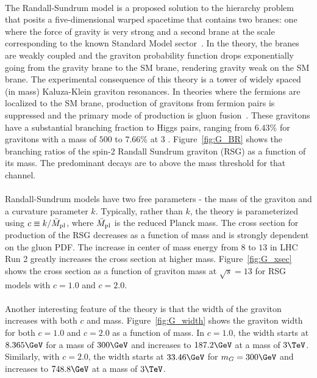 \paragraph{}
The Randall-Sundrum model is a proposed solution to the hierarchy problem that posits a five-dimensional warped spacetime that contains two branes: one where the force of gravity is very strong and a second brane at the \TeV scale corresponding to the known Standard Model sector~\cite{RSG1}. In the theory, the branes are weakly coupled and the graviton probability function drops exponentially going from the gravity brane to the SM brane, rendering gravity weak on the SM brane. The experimental consequence of this theory is a tower of widely spaced (in mass) Kaluza-Klein graviton resonances. In theories where the fermions are localized to the SM brane, production of gravitons from fermion pairs is suppressed and the primary mode of production is gluon fusion~\cite{RSG_LHC}. These gravitons have a substantial branching fraction to Higgs pairs, ranging from $6.43$\% for gravitons with a mass of $500$ \GeV to $7.66\%$ at $3$ \TeV. Figure~\ref{fig:G_BR} shows the branching ratios of the spin-2 Randall Sundrum graviton (RSG) as a function of its mass. The predominant decays are to \ttbar above the mass threshold for that channel. 

\paragraph{}
Randall-Sundrum models have two free parameters - the mass of the graviton and a curvature parameter $k$. Typically, rather than $k$, the theory is parameterized using $c \equiv k/\bar{M}_{\rm pl}$, where $\bar{M}_{\rm pl}$ is the reduced Planck mass. The cross section for production of the RSG decreases as a function of mass and is strongly dependent on the gluon PDF. The increase in center of mass energy from $8$ to $13$ \TeV in LHC Run 2 greatly increases the cross section at higher mass. Figure~\ref{fig:G_xsec} shows the cross section as a function of graviton mass at $\sqrt{s} = 13$ \TeV for RSG models with $c=1.0$ and $c=2.0$. 

\paragraph{}
Another interesting feature of the theory is that the width of the graviton increases with both $c$ and mass. Figure~\ref{fig:G_width} shows the graviton width for both $c=1.0$ and $c=2.0$ as a function of mass. In $c=1.0$, the width starts at $8.365 \GeV$ for a mass of $300 \GeV$ and increases to $187.2 \GeV$ at a mass of $3 \TeV$. Similarly, with $c=2.0$, the width starts at $33.46 \GeV$ for $m_G = 300 \GeV$ and increases to $748.8 \GeV$ at a mass of $3 \TeV$. 


